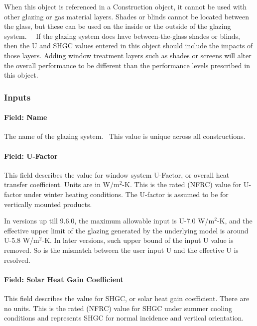 When this object is referenced in a Construction object, it cannot be used with other glazing or gas material layers. Shades or blinds cannot be located between the glass, but these can be used on the inside or the outside of the glazing system.~~ If the glazing system does have between-the-glass shades or blinds, then the U and SHGC values entered in this object should include the impacts of those layers. Adding window treatment layers such as shades or screens will alter the overall performance to be different than the performance levels prescribed in this object.

\subsubsection{Inputs}\label{inputs-21-006}

\paragraph{Field: Name}\label{field-name-15-009}

The name of the glazing system.~ This value is unique across all constructions.

\paragraph{Field: U-Factor}\label{field-u-factor}

This field describes the value for window system U-Factor, or overall heat transfer coefficient. Units are in W/m$^{2}$-K. This is the rated (NFRC) value for U-factor under winter heating conditions. The U-factor is assumed to be for vertically mounted products.

In versions up till 9.6.0, the maximum allowable input is U-7.0 W/m$^{2}$-K, and the effective upper limit of the glazing generated by the underlying model is around U-5.8 W/m$^{2}$-K. In later versions, such upper bound of the input U value is removed. So is the mismatch between the user input U and the effective U is resolved.

\paragraph{Field: Solar Heat Gain Coefficient}\label{field-solar-heat-gain-coefficient}

This field describes the value for SHGC, or solar heat gain coefficient. There are no units. This is the rated (NFRC) value for SHGC under summer cooling conditions and represents SHGC for normal incidence and vertical orientation.

